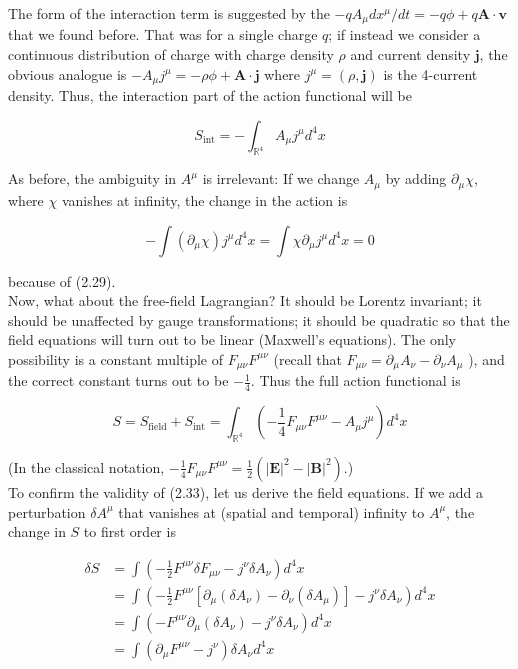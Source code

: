 \documentclass[10pt, letterpaper]{article}
\begin{document}
The form of the interaction term is suggested by the $-q A_{\mu} d x^{\mu} / d t=-q \phi+q \mathbf{A} \cdot \mathbf{v}$ that we found before. That was for a single charge $q$; if instead we consider a continuous distribution of charge with charge density $\rho$ and current density $\mathbf{j}$, the obvious analogue is $-A_{\mu} j^{\mu}=-\rho \phi+\mathbf{A} \cdot \mathbf{j}$ where $j^{\mu}=(\rho, \mathbf{j})$ is the 4-current density. Thus, the interaction part of the action functional will be

$$
S_{\mathrm{int}}=-\int_{\mathbb{R}^{4}} A_{\mu} j^{\mu} d^{4} x
$$

As before, the ambiguity in $A^{\mu}$ is irrelevant: If we change $A_{\mu}$ by adding $\partial_{\mu} \chi$, where $\chi$ vanishes at infinity, the change in the action is

$$
-\int\left(\partial_{\mu} \chi\right) j^{\mu} d^{4} x=\int \chi \partial_{\mu} j^{\mu} d^{4} x=0
$$

because of (2.29).\\
Now, what about the free-field Lagrangian? It should be Lorentz invariant; it should be unaffected by gauge transformations; it should be quadratic so that the field equations will turn out to be linear (Maxwell's equations). The only possibility is a constant multiple of $F_{\mu \nu} F^{\mu \nu}$ (recall that $F_{\mu \nu}=\partial_{\mu} A_{\nu}-\partial_{\nu} A_{\mu}$ ), and the correct constant turns out to be $-\frac{1}{4}$. Thus the full action functional is

$$
S=S_{\mathrm{field}}+S_{\mathrm{int}}=\int_{\mathbb{R}^{4}}\left(-\frac{1}{4} F_{\mu \nu} F^{\mu \nu}-A_{\mu} j^{\mu}\right) d^{4} x
$$

(In the classical notation, $-\frac{1}{4} F_{\mu \nu} F^{\mu \nu}=\frac{1}{2}\left(|\mathbf{E}|^{2}-|\mathbf{B}|^{2}\right)$.)\\
To confirm the validity of (2.33), let us derive the field equations. If we add a perturbation $\delta A^{\mu}$ that vanishes at (spatial and temporal) infinity to $A^{\mu}$, the change in $S$ to first order is

$$
\begin{aligned}
\delta S & =\int\left(-\frac{1}{2} F^{\mu \nu} \delta F_{\mu \nu}-j^{\nu} \delta A_{\nu}\right) d^{4} x \\
& =\int\left(-\frac{1}{2} F^{\mu \nu}\left[\partial_{\mu}\left(\delta A_{\nu}\right)-\partial_{\nu}\left(\delta A_{\mu}\right)\right]-j^{\nu} \delta A_{\nu}\right) d^{4} x \\
& =\int\left(-F^{\mu \nu} \partial_{\mu}\left(\delta A_{\nu}\right)-j^{\nu} \delta A_{\nu}\right) d^{4} x \\
& =\int\left(\partial_{\mu} F^{\mu \nu}-j^{\nu}\right) \delta A_{\nu} d^{4} x
\end{aligned}
$$
\end{document}
